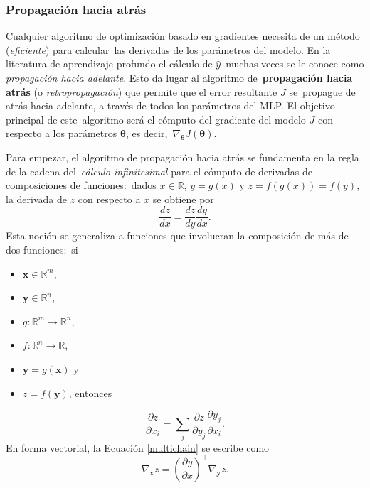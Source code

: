 \subsubsection{Propagación hacia atrás}

\noindent
Cualquier algoritmo de optimización basado en gradientes necesita de un método (\emph{eficiente}) para calcular\
las derivadas de los parámetros del modelo. En la literatura de aprendizaje profundo el cálculo de $\hat{y}$\
muchas veces se le conoce como \emph{propagación hacia adelante}. Esto da lugar al algoritmo de\
\textbf{propagación hacia atrás} (o \emph{retropropagación}) que permite que el error resultante $J$ se\
propague de atrás hacia adelante, a través de todos los parámetros del MLP. El objetivo principal de este\
algoritmo será el cómputo del gradiente del modelo $J$ con respecto a los parámetros $\bm{\theta}$, es decir,\
$\nabla_{\bm{\theta}} J(\bm{\theta})$.\par
Para empezar, el algoritmo de propagación hacia atrás se fundamenta en la regla de la cadena del\
\emph{cálculo infinitesimal} para el cómputo de derivadas de composiciones de funciones:\
dados $x \in \mathbb{R}$, $y = g(x)$ y $z = f(g(x)) = f(y)$, la derivada de $z$ con respecto a $x$ se obtiene por
\begin{equation}
  \frac{dz}{dx} =  \frac{dz}{dy} \frac{dy}{dx}.
\end{equation}
Esta noción se generaliza a funciones que involucran la composición de más de dos funciones:\
si
\begin{itemize}
\item $\mathbf{x} \in \mathbb{R}^m$,
\item $\mathbf{y} \in \mathbb{R}^n$,
\item $g: \mathbb{R}^m \to \mathbb{R}^n$,
\item $f: \mathbb{R}^n \to \mathbb{R}$,
\item $\mathbf{y} = g(\mathbf{x})$ y
\item $z = f(\mathbf{y})$, entonces
\end{itemize}
\begin{equation}
  \frac{\partial z}{\partial x_i} =
  \sum_j \frac{\partial z}{\partial y_j} \frac{\partial y_j}{\partial x_i}. \label{multichain}
\end{equation}
En forma vectorial, la Ecuación \ref{multichain} se escribe como
\begin{equation}
  \nabla_{\mathbf{x}} z =
  \left(\frac{\partial y}{\partial x}\right)^\top \nabla_{\mathbf{y}} z. \label{vectchain}
\end{equation}\par
